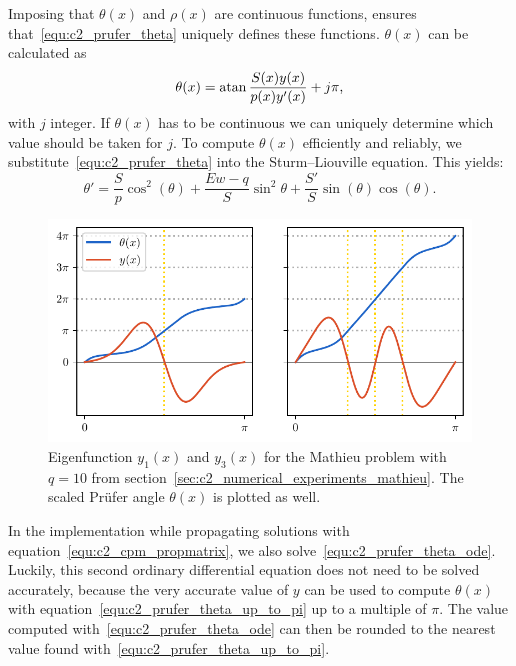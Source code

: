 Imposing that $\theta(x)$ and $\rho(x)$ are continuous functions, ensures that~\eqref{equ:c2_prufer_theta} uniquely defines these functions. $\theta(x)$ can be calculated as
\begin{equation}\label{equ:c2_prufer_theta_up_to_pi}
    \theta(x) = \atan\frac{S(x)y(x)}{p(x) y'(x)} + j\pi\text{,}
\end{equation}
with $j$ integer. If $\theta(x)$ has to be continuous we can uniquely determine which value should be taken for $j$. To compute $\theta(x)$ efficiently and reliably, we substitute~\eqref{equ:c2_prufer_theta} into the Sturm--Liouville equation. This yields:
\begin{equation}\label{equ:c2_prufer_theta_ode}
    \theta' = \frac{S}{p} \cos^2(\theta) + \frac{Ew - q}{S}\sin^2\theta + \frac{S'}{S}\sin(\theta)\cos(\theta)\text{.}
\end{equation}

\begin{figure}
    \begin{center}
        \includegraphics[width=\textwidth]{img/chapter2/prufer/prufer_curves.pdf}
    \end{center}
    \caption{Eigenfunction $y_1(x)$ and $y_3(x)$ for the Mathieu problem with $q = 10$ from section~\ref{sec:c2_numerical_experiments_mathieu}. The scaled Prüfer angle $\theta(x)$ is plotted as well.}\label{fig:c2_prufer_curves}
\end{figure}

In the implementation while propagating solutions with equation~\eqref{equ:c2_cpm_propmatrix}, we also solve~\eqref{equ:c2_prufer_theta_ode}. Luckily, this second ordinary differential equation does not need to be solved accurately, because the very accurate value of $y$ can be used to compute $\theta(x)$ with equation~\eqref{equ:c2_prufer_theta_up_to_pi} up to a multiple of $\pi$. The value computed with~\eqref{equ:c2_prufer_theta_ode} can then be rounded to the nearest value found with~\eqref{equ:c2_prufer_theta_up_to_pi}.

